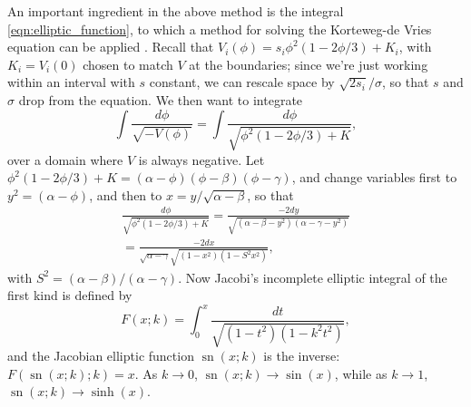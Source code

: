 \documentclass{article}
\newif\ifsubmissionversion
\newcommand{\citep}[1]{\cite{#1}}
\DeclareMathOperator{\sn}{sn}
\begin{document}
An important ingredient in the above method is the integral \eqref{eqn:elliptic_function},
to which a method for solving the Korteweg-de Vries equation can be applied \citep{NEQwiki}.
Recall that $V_i(\phi) =  s_i \phi^2(1-2\phi/3) + K_i$, with $K_i = V_i(0)$ chosen to match $V$ at the boundaries;
since we're just working within an interval with $s$ constant, we can rescale space by $\sqrt{2 s_i}/\sigma$,
so that $s$ and $\sigma$ drop from the equation.
We then want to integrate
\[
    \int \frac{ d\phi }{ \sqrt{-V(\phi)} } = 
         \int \frac{ d\phi }{ \sqrt{ \phi^2 (1-2\phi/3) + K } } ,
\]
over a domain where $V$ is always negative.
Let $\phi^2(1-2\phi/3)+K = (\alpha-\phi)(\phi-\beta)(\phi-\gamma)$,
and change variables first to $y^2=(\alpha-\phi)$, 
and then to $x = y/\sqrt{\alpha-\beta}$, so that
\begin{align*}
    \frac{ d\phi }{ \sqrt{ \phi^2 (1-2\phi/3) + K } } 
        = \frac{ - 2 dy }{ \sqrt{ (\alpha-\beta-y^2) (\alpha-\gamma-y^2) } } \\
        = \frac{ - 2 dx }{ \sqrt{\alpha-\gamma} \sqrt{ (1-x^2) (1-S^2 x^2) } } ,
\end{align*}
with $S^2 = (\alpha-\beta)/(\alpha-\gamma)$.
Now Jacobi's incomplete elliptic integral of the first kind is defined by
\[
    F(x;k) = \int_0^x \frac{dt}{\sqrt{ (1-t^2)(1-k^2t^2) }} ,
\]
and the Jacobian elliptic function $\sn(x;k)$ is the inverse: $F(\sn(x;k);k) = x$.
As $k \to 0$, $\sn(x;k) \to \sin(x)$, while as $k \to 1$, $\sn(x;k) \to \sinh(x)$.






\ifsubmissionversion
\processdelayedfloats
\fi
\end{document}
